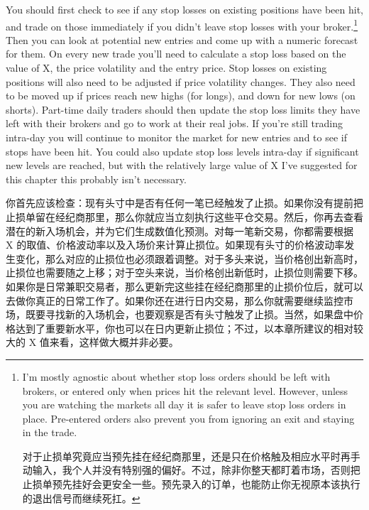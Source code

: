 \begin{englishblock} You should first check to see if any stop losses on existing positions have been hit, and trade on those immediately if you didn't leave stop losses with your broker.\footnote{I'm mostly agnostic about whether stop loss orders should be left with brokers, or entered only when prices hit the relevant level. However, unless you are watching the markets all day it is safer to leave stop loss orders in place. Pre-entered orders also prevent you from ignoring an exit and staying in the trade. \par 对于止损单究竟应当预先挂在经纪商那里，还是只在价格触及相应水平时再手动输入，我个人并没有特别强的偏好。不过，除非你整天都盯着市场，否则把止损单预先挂好会更安全一些。预先录入的订单，也能防止你无视原本该执行的退出信号而继续死扛。} Then you can look at potential new entries and come up with a numeric forecast for them. On every new trade you'll need to calculate a stop loss based on the value of X, the price volatility and the entry price. Stop losses on existing positions will also need to be adjusted if price volatility changes. They also need to be moved up if prices reach new highs (for longs), and down for new lows (on shorts). Part-time daily traders should then update the stop loss limits they have left with their brokers and go to work at their real jobs. If you're still trading intra-day you will continue to monitor the market for new entries and to see if stops have been hit. You could also update stop loss levels intra-day if significant new levels are reached, but with the relatively large value of X I've suggested for this chapter this probably isn't necessary. \end{englishblock}

\begin{chineseblock}你首先应该检查：现有头寸中是否有任何一笔已经触发了止损。如果你没有提前把止损单留在经纪商那里，那么你就应当立刻执行这些平仓交易。然后，你再去查看潜在的新入场机会，并为它们生成数值化预测。对每一笔新交易，你都需要根据 X 的取值、价格波动率以及入场价来计算止损位。如果现有头寸的价格波动率发生变化，那么对应的止损位也必须跟着调整。对于多头来说，当价格创出新高时，止损位也需要随之上移；对于空头来说，当价格创出新低时，止损位则需要下移。如果你是日常兼职交易者，那么更新完这些挂在经纪商那里的止损价位后，就可以去做你真正的日常工作了。如果你还在进行日内交易，那么你就需要继续监控市场，既要寻找新的入场机会，也要观察是否有头寸触发了止损。当然，如果盘中价格达到了重要新水平，你也可以在日内更新止损位；不过，以本章所建议的相对较大的 X 值来看，这样做大概并非必要。\end{chineseblock}

